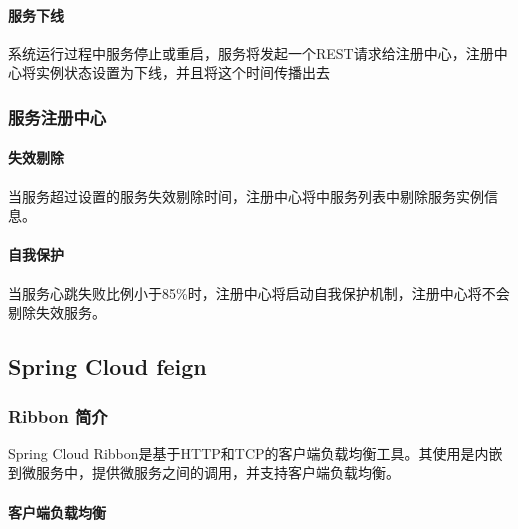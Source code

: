 \documentclass[letterpaper,10pt,english]{sphinxmanual}
\begin{document}
\paragraph{服务下线}
\label{\detokenize{01.spring-cloud/02.eureka/eureka_03:id9}}
系统运行过程中服务停止或重启，服务将发起一个REST请求给注册中心，注册中心将实例状态设置为下线，并且将这个时间传播出去


\subsubsection{服务注册中心}
\label{\detokenize{01.spring-cloud/02.eureka/eureka_03:id10}}

\paragraph{失效剔除}
\label{\detokenize{01.spring-cloud/02.eureka/eureka_03:id11}}
当服务超过设置的服务失效剔除时间，注册中心将中服务列表中剔除服务实例信息。


\paragraph{自我保护}
\label{\detokenize{01.spring-cloud/02.eureka/eureka_03:id12}}
当服务心跳失败比例小于85\%时，注册中心将启动自我保护机制，注册中心将不会剔除失效服务。


\subsection{Spring Cloud feign}
\label{\detokenize{01.spring-cloud/03.feign/feign:spring-cloud-feign}}\label{\detokenize{01.spring-cloud/03.feign/feign::doc}}

\subsubsection{Ribbon 简介}
\label{\detokenize{01.spring-cloud/03.feign/ribbon_01:ribbon}}\label{\detokenize{01.spring-cloud/03.feign/ribbon_01::doc}}
Spring Cloud Ribbon是基于HTTP和TCP的客户端负载均衡工具。其使用是内嵌到微服务中，提供微服务之间的调用，并支持客户端负载均衡。


\paragraph{客户端负载均衡}
\label{\detokenize{01.spring-cloud/03.feign/ribbon_01:id1}}
\noindent{}
\end{document}
